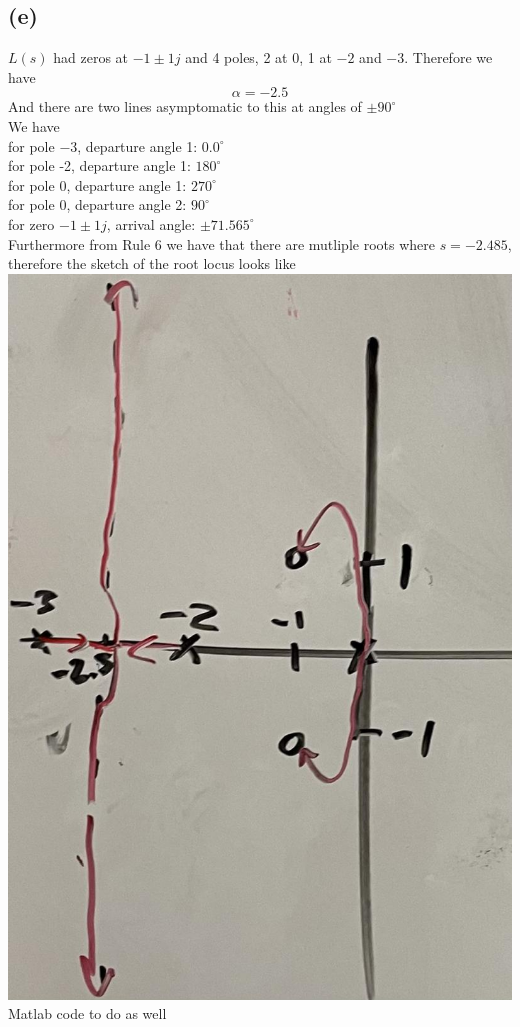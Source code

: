 \documentclass[12pt]{article}
\begin{document}
\subsection*{(e)}
$L(s)$ had zeros at $-1\pm1j$ and 4 poles, 2 at 0, 1 at $-2$ and $-3$. Therefore we have
$$\alpha=-2.5$$
And there are two lines asymptomatic to this at angles of $\pm90^{\circ}$
\\
We have
\\for pole $-3$, departure angle 1: $0.0^{\circ}$
\\for pole -2, departure angle 1: $180^{\circ}$
\\for pole 0, departure angle 1: $270^{\circ}$
\\for pole 0, departure angle 2: $90^{\circ}$
\\for zero $-1\pm1j$, arrival angle: $\pm71.565^{\circ}$\\
Furthermore from Rule 6 we have that there are mutliple roots where $s=-2.485$, therefore the sketch of the root locus looks like
\\
\includegraphics[scale=.15]{Problem2Sketch2.jpg}
Matlab code to do as well
\end{document}
